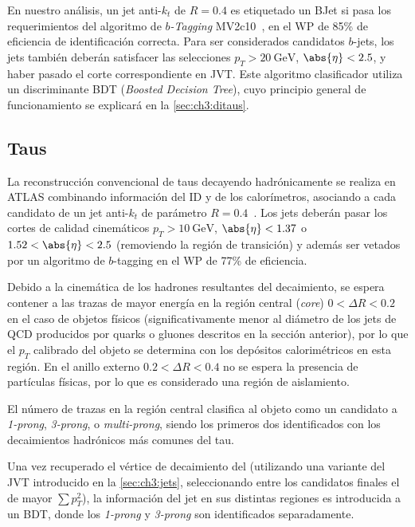 En nuestro análisis, un jet anti-$k_t$ de $R = 0.4$ es etiquetado un BJet si pasa los requerimientos del algoritmo de \textit{$b$-Tagging} MV2c10~\cite{Aad2019}, en el WP de 85\% de eficiencia de identificación correcta. Para ser considerados candidatos $b$-jets, los jets también deberán satisfacer las selecciones $p_T > \SI{20}{\GeV}$, $\abs{\eta} < 2.5$, y haber pasado el corte correspondiente en JVT. Este algoritmo clasificador utiliza un discriminante BDT (\textit{Boosted Decision Tree}), cuyo principio general de funcionamiento se explicará en la \cref{sec:ch3:ditaus}.



\subsection{Taus} \label{sec:ch3:single-taus}

La reconstrucción convencional de taus decayendo hadrónicamente se realiza en ATLAS combinando información del ID y de los calorímetros, asociando a cada candidato de \thad un jet anti-$k_t$ de parámetro $R = 0.4$~\cite{Hubner2018}. Los jets deberán pasar los cortes de calidad cinemáticos $p_T > \SI{10}{\GeV}$, $\abs{\eta} < 1.37$ o $1.52 < \abs{\eta} < 2.5$ (removiendo la región de transición) y además ser vetados por un algoritmo de $b$-tagging en el WP de 77\% de eficiencia.

Debido a la cinemática de los hadrones resultantes del decaimiento, se espera contener a las trazas de mayor energía en la región central (\textit{core}) $0 < \Delta R < 0.2$ en el caso de objetos \ttau físicos (significativamente menor al diámetro de los jets de QCD producidos por quarks o gluones descritos en la sección anterior), por lo que el $p_T$ calibrado del objeto se determina con los depósitos calorimétricos en esta región. En el anillo externo $0.2 < \Delta R < 0.4$ no se espera la presencia de partículas físicas, por lo que es considerado una región de aislamiento.

El número de trazas en la región central clasifica al objeto como un candidato a \thad \textit{1-prong}, \textit{3-prong}, o \textit{multi-prong}, siendo los primeros dos identificados con los decaimientos hadrónicos más comunes del tau.

Una vez recuperado el vértice de decaimiento del \ttau (utilizando una variante del JVT introducido en la \cref{sec:ch3:jets}, seleccionando entre los candidatos finales el de mayor $\sum p_T^2$), la información del jet en sus distintas regiones es introducida a un BDT, donde los \thad \textit{1-prong} y \textit{3-prong} son identificados separadamente.


